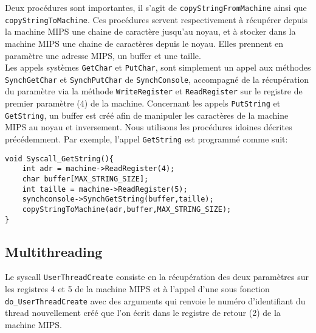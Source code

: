 \documentclass{report}
\begin{document}
Deux procédures sont importantes, il s'agit de \texttt{copyStringFromMachine} ainsi que \texttt{copyStringToMachine}. Ces procédures servent respectivement à récupérer depuis la machine MIPS une chaine de caractère jusqu'au noyau, et à stocker dans la machine MIPS une chaine de caractères depuis le noyau. Elles prennent en paramètre une adresse MIPS, un buffer et une taille.\\

Les appels systèmes \texttt{GetChar} et \texttt{PutChar}, sont simplement un appel aux méthodes \texttt{SynchGetChar} et \texttt{SynchPutChar} de \texttt{SynchConsole}, accompagné de la récupération du paramètre via la méthode \texttt{WriteRegister} et \texttt{ReadRegister} sur le registre de premier paramètre (4) de la machine. Concernant les appels \texttt{PutString} et \texttt{GetString}, un buffer est créé afin de manipuler les caractères de la machine MIPS au noyau et inversement. Nous utilisons les procédures idoines décrites précédemment. Par exemple, l'appel \texttt{GetString} est programmé comme suit:
\begin{verbatim}
void Syscall_GetString(){
    int adr = machine->ReadRegister(4); 
    char buffer[MAX_STRING_SIZE];
    int taille = machine->ReadRegister(5);
    synchconsole->SynchGetString(buffer,taille);
    copyStringToMachine(adr,buffer,MAX_STRING_SIZE); 
}
\end{verbatim}

\subsection*{Multithreading}
Le syscall \texttt{UserThreadCreate} consiste en la récupération des deux paramètres sur les registres 4 et 5 de la machine MIPS et à l'appel d'une sous fonction \texttt{do\_UserThreadCreate} avec des arguments qui renvoie le numéro d'identifiant du thread nouvellement créé que l'on écrit dans le registre de retour (2) de la machine MIPS.\\
\end{document}

